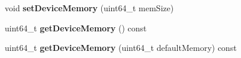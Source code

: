 \begin{DoxyCompactItemize}
\mbox{\label{structglow_1_1runtime_1_1_device_config_a1138d9618a18b486d1e3cc66ddee3d2b}} 
void {\bfseries set\+Device\+Memory} (uint64\+\_\+t mem\+Size)
\item 
\mbox{\label{structglow_1_1runtime_1_1_device_config_afa7e1e12a8f1a3490edc3139781b78d1}} 
uint64\+\_\+t {\bfseries get\+Device\+Memory} () const
\item 
\mbox{\label{structglow_1_1runtime_1_1_device_config_a35b232cd14f5427b4fd55121d301c7b7}} 
uint64\+\_\+t {\bfseries get\+Device\+Memory} (uint64\+\_\+t default\+Memory) const
\end{DoxyCompactItemize}
